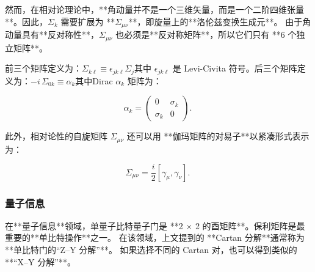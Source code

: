 然而，在相对论理论中，**角动量并不是一个三维矢量，而是一个二阶四维张量**。因此，$\Sigma_k$ 需要扩展为 **$\Sigma_{\mu\nu}$**，即旋量上的**洛伦兹变换生成元**。
由于角动量具有**反对称性**，$\Sigma_{\mu\nu}$ 也必须是**反对称矩阵**，所以它们只有 **6 个独立矩阵**。

前三个矩阵定义为：$\Sigma_{k\ell} \equiv \epsilon_{jk\ell} \Sigma_j$其中 $\epsilon_{jk\ell}$ 是 Levi-Civita 符号。后三个矩阵定义为：$-i \, \Sigma_{0k} \equiv \alpha_k$其中Dirac $\alpha_k$ 矩阵为：

  $$
  \alpha_k =
  \begin{pmatrix}
  0 & \sigma_k \\
  \sigma_k & 0
  \end{pmatrix}.~
  $$

此外，相对论性的自旋矩阵 $\Sigma_{\mu\nu}$ 还可以用 **伽玛矩阵的对易子**以紧凑形式表示为：

$$
\Sigma_{\mu\nu} = \frac{i}{2} [\gamma_\mu, \gamma_\nu].~
$$
\subsubsection{量子信息}
在**量子信息**领域，单量子比特量子门是 **2 × 2 的酉矩阵**。保利矩阵是最重要的**单比特操作**之一。
在该领域，上文提到的 **Cartan 分解**通常称为 **单比特门的“Z–Y 分解”**。
如果选择不同的 Cartan 对，也可以得到类似的 **“X–Y 分解”**。
